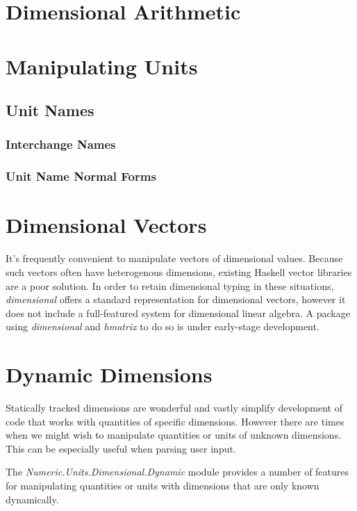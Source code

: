 \documentclass[11pt]{report}
\newcommand{\packagename}[1]{\textit{#1}}
\newcommand{\thispackage}{\packagename{dimensional}}
\newcommand{\modulename}[1]{\textit{#1}}
\newcommand{\submodule}[1]{\modulename{Numeric.Units.Dimensional.{#1}}}
\begin{document}
\chapter{Dimensional Arithmetic}

\chapter{Manipulating Units}

\section{Unit Names}

\subsection{Interchange Names}
\subsection{Unit Name Normal Forms}

\chapter{Dimensional Vectors}

It's frequently convenient to manipulate vectors of dimensional values. Because such vectors often have heterogenous
dimensions, existing Haskell vector libraries are a poor solution. In order to retain dimensional typing in these situations,
\thispackage{} offers a standard representation for dimensional vectors, however it does not include a full-featured system for
dimensional linear algebra. A package using \thispackage{} and \packagename{hmatrix} to do so is under early-stage development.


\chapter{Dynamic Dimensions}

Statically tracked dimensions are wonderful and vastly simplify development of code that works with quantities of specific
dimensions. However there are times when we might wish to manipulate quantities or units of unknown dimensions. This can be
especially useful when parsing user input.

The \submodule{Dynamic} module provides a number of features for manipulating quantities or units with dimensions that are only
known dynamically.
\end{document}
